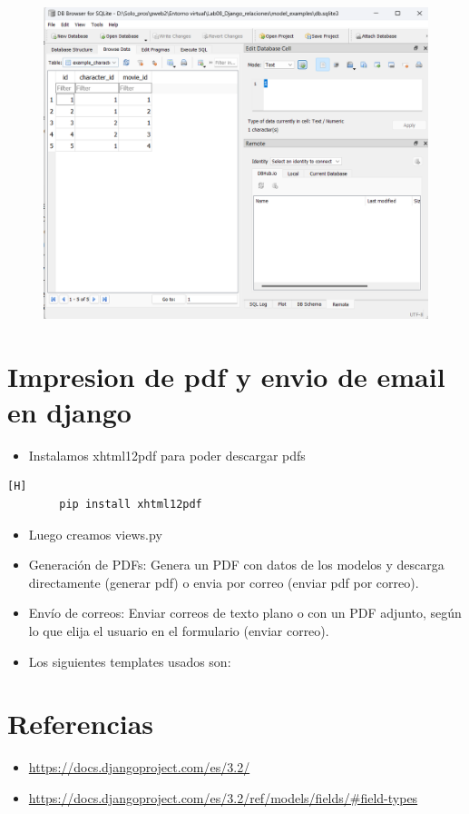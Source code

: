 \documentclass{article}
\begin{document}
	\begin{figure}[H]
		\centering
		\includegraphics[width=1.0\textwidth,keepaspectratio]{img/C5.png}
	\end{figure}	
\section{Impresion de pdf y envio de email en django}
	\begin{itemize}
		\item Instalamos xhtml12pdf para poder descargar pdfs
	\end{itemize}
	\begin{lstlisting}[language=bash,caption={Instalar xhtml12pdf}][H]
		pip install xhtml12pdf
	\end{lstlisting}
	\begin{itemize}
		\item Luego creamos views.py
	\end{itemize}	
	
	\begin{itemize}
		\item Generación de PDFs: Genera un PDF con datos de los modelos y descarga directamente (generar pdf) o envia por correo (enviar pdf por correo).
		\item Envío de correos: Enviar correos de texto plano o con un PDF adjunto, según lo que elija el usuario en el formulario (enviar correo).
		\item Los siguientes templates usados son:
	\end{itemize}	
	
	

\section{Referencias}
\begin{itemize}			
	\item \url{https://docs.djangoproject.com/es/3.2/}
	\item\url{https://docs.djangoproject.com/es/3.2/ref/models/fields/#field-types}
\end{itemize}	
	
%
%
%
			
\end{document}
